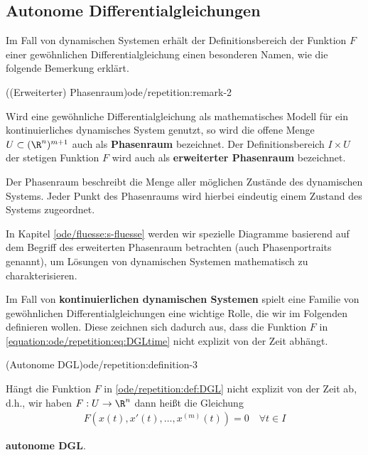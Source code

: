 \documentclass[letterpaper,10pt,english]{jupyterBook}
\begin{document}
\subsection{Autonome Differentialgleichungen}
\label{\detokenize{ode/repetition:autonome-differentialgleichungen}}
\par
Im Fall von dynamischen Systemen erhält der Definitionsbereich der Funktion \(F\) einer gewöhnlichen Differentialgleichung einen besonderen Namen, wie die folgende Bemerkung erklärt.
\begin{remark}{((Erweiterter) Phasenraum)}{ode/repetition:remark-2}



\par
Wird eine gewöhnliche Differentialgleichung als mathematisches Modell für ein kontinuierliches dynamisches System genutzt, so wird die offene Menge \(U\subset (\R^n)^{m+1}\) auch als \textbf{Phasenraum} bezeichnet.
Der Definitionsbereich \(I\times U\) der stetigen Funktion \(F\) wird auch als \textbf{erweiterter Phasenraum} bezeichnet.

\par
Der Phasenraum beschreibt die Menge aller möglichen Zustände des dynamischen Systems.
Jeder Punkt des Phasenraums wird hierbei eindeutig einem Zustand des Systems zugeordnet.

\par
In Kapitel \cref{ode/fluesse:s-fluesse}  werden wir spezielle Diagramme basierend auf dem Begriff des erweiterten Phasenraum betrachten (auch Phasenportraits genannt), um Lösungen von dynamischen Systemen mathematisch zu charakterisieren.
\end{remark}

\par
Im Fall von \textbf{kontinuierlichen dynamischen Systemen} spielt eine Familie von gewöhnlichen Differentialgleichungen eine wichtige Rolle, die wir im Folgenden definieren wollen.
Diese zeichnen sich dadurch aus, dass die Funktion \(F\) in \eqref{equation:ode/repetition:eq:DGLtime} nicht explizit von der Zeit abhängt.
\begin{definition}{(Autonome DGL)}{ode/repetition:definition-3}



\par
Hängt die Funktion \(F\) in \cref{ode/repetition:def:DGL} nicht explizit von der Zeit ab, d.h., wir haben \(F:U\rightarrow\R^n\) dann heißt die Gleichung
\begin{align}\label{equation:ode/repetition:eq:autonomeDGL}
F(x(t), x'(t), \ldots, x^{(m)}(t)) = 0 \quad \forall t\in I
\end{align}
\par
\textbf{autonome DGL}.
\end{definition}
\end{document}
